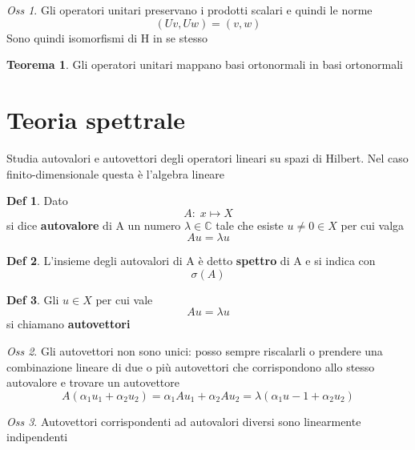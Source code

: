 \documentclass[a4paper,11pt]{report}
\theoremstyle{remark}
\newtheorem*{oss}{Oss}
\theoremstyle{definition}
\newtheorem*{teo}{Teorema}
\newtheorem*{Def}{Def}
\newcommand{\C}{\mathbb{C}}
\begin{document}
\begin{oss}
	Gli operatori unitari preservano i prodotti scalari e quindi le norme
	\begin{equation*}
		(Uv, Uw) = (v,w)
	\end{equation*}
	Sono quindi isomorfismi di H in se stesso
\end{oss}

\begin{teo}
	Gli operatori unitari mappano basi ortonormali in basi ortonormali
\end{teo}

\section{Teoria spettrale}

Studia autovalori e autovettori degli operatori lineari su spazi di Hilbert. Nel caso finito-dimensionale questa è l'algebra lineare

\begin{Def}
	Dato 
	\begin{equation*}
		A: \; x \mapsto X
	\end{equation*}
	si dice \textbf{autovalore} di A un numero $\lambda \in \C$ tale che esiste $u\ne 0 \in X$ per cui valga 
	\begin{equation*}
		Au = \lambda u
	\end{equation*}
\end{Def}
\begin{Def}
	L'insieme degli autovalori di A è detto \textbf{spettro} di A e si indica con
	\begin{equation*}
		\sigma(A)
	\end{equation*}
\end{Def}
\begin{Def}
	Gli $u\in X$ per cui vale 
	\begin{equation*}
		Au = \lambda u
	\end{equation*}
	si chiamano \textbf{autovettori}
\end{Def}

\begin{oss}
	Gli autovettori non sono unici: posso sempre riscalarli o prendere una combinazione lineare di due o più autovettori che corrispondono allo stesso autovalore e trovare un autovettore
	\begin{equation*}
		A(\alpha_1 u_1 + \alpha_2u_2) = \alpha_1Au_1 + \alpha_2Au_2 = \lambda(\alpha_1u-1+\alpha_2u_2)
	\end{equation*}
\end{oss}
\begin{oss}
	Autovettori corrispondenti ad autovalori diversi sono linearmente indipendenti
\end{oss}
\end{document}
